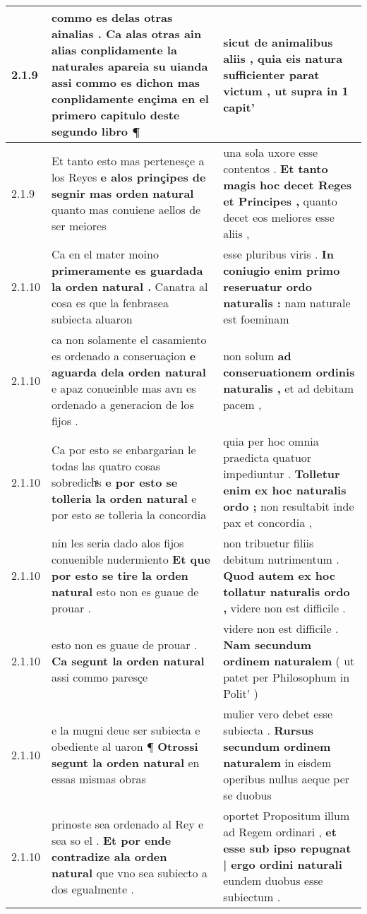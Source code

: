 \begin{tabular}{|p{1cm}|p{6.5cm}|p{6.5cm}|}
2.1.9 & commo es delas otras ainalias . \textbf{ Ca alas otras ain alias conplidamente la naturales apareia su uianda } assi commo es dichon mas conplidamente ençima en el primero capitulo deste segundo libro ¶ & sicut de animalibus aliis , \textbf{ quia eis natura sufficienter parat victum , } ut supra in 1 capit’ \\\hline
2.1.9 & Et tanto esto mas pertenesçe a los Reyes \textbf{ e alos prinçipes de segnir mas orden natural } quanto mas conuiene aellos de ser meiores & una sola uxore esse contentos . \textbf{ Et tanto magis hoc decet Reges et Principes , } quanto decet eos meliores esse aliis , \\\hline
2.1.10 & Ca en el mater moino \textbf{ primeramente es guardada la orden natural . } Canatra al cosa es que la fenbrasea subiecta aluaron & esse pluribus viris . \textbf{ In coniugio enim primo reseruatur ordo naturalis : } nam naturale est foeminam \\\hline
2.1.10 & ca non solamente el casamiento es ordenado a conseruaçion \textbf{ e aguarda dela orden natural } e apaz conueinble mas avn es ordenado a generacion de los fijos . & non solum \textbf{ ad conseruationem ordinis naturalis , } et ad debitam pacem , \\\hline
2.1.10 & Ca por esto se enbargarian le todas las quatro cosas sobredichͣs \textbf{ e por esto se tolleria la orden natural } e por esto se tolleria la concordia & quia per hoc omnia praedicta quatuor impediuntur . \textbf{ Tolletur enim ex hoc naturalis ordo ; } non resultabit inde pax et concordia , \\\hline
2.1.10 & nin les seria dado alos fijos conuenible nudermiento \textbf{ Et que por esto se tire la orden natural } esto non es guaue de prouar . & non tribuetur filiis debitum nutrimentum . \textbf{ Quod autem ex hoc tollatur naturalis ordo , } videre non est difficile . \\\hline
2.1.10 & esto non es guaue de prouar . \textbf{ Ca segunt la orden natural } assi commo paresçe & videre non est difficile . \textbf{ Nam secundum ordinem naturalem } ( ut patet per Philosophum in Polit’ ) \\\hline
2.1.10 & e la mugni deue ser subiecta e obediente al uaron ¶ \textbf{ Otrossi segunt la orden natural } en essas mismas obras & mulier vero debet esse subiecta . \textbf{ Rursus secundum ordinem naturalem } in eisdem operibus nullus aeque per se duobus \\\hline
2.1.10 & prinoste sea ordenado al Rey e sea so el . \textbf{ Et por ende contradize ala orden natural } que vno sea subiecto a dos egualmente . & oportet Propositum illum ad Regem ordinari , \textbf{ et esse sub ipso repugnat | ergo ordini naturali } eundem duobus esse subiectum . \\\hline

\end{tabular}

